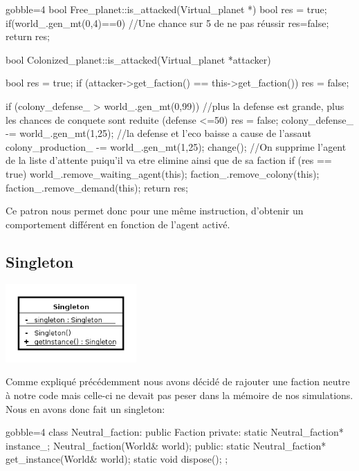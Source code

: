   \begin{cppcode*}{gobble=4}
    bool Free_planet::is_attacked(Virtual_planet *) {
      bool res = true;
        if(world_.gen_mt(0,4)==0){ //Une chance sur 5 de ne pas réussir
          res=false;
      }
      return res;
    }

    bool Colonized_planet::is_attacked(Virtual_planet *attacker) {
      bool res = true;
      if (attacker->get_faction() == this->get_faction()) {
          res = false;
      }
     
        if (colony_defense_ > world_.gen_mt(0,99)){ //plus la defense est grande, plus les chances de conquete sont reduite (defense <=50)
          res = false;
          colony_defense_ -= world_.gen_mt(1,25); //la defense et l'eco baisse a cause de l'assaut
          colony_production_ -= world_.gen_mt(1,25);
          change();
        }
      //On supprime l'agent de la liste d'attente puiqu'il va etre elimine ainsi que de sa faction
      if (res == true) {
          world_.remove_waiting_agent(this);
          faction_.remove_colony(this);
          faction_.remove_demand(this);
      }
      return res;
    }
  \end{cppcode*}
  Ce patron nous permet donc pour une même instruction, d’obtenir un comportement différent en fonction de l’agent activé.

  \subsection{Singleton}

  \begin{center}
    \includegraphics[height=3cm]{images/single.png}
  \end{center}

  Comme expliqué précédemment nous avons décidé de rajouter une faction neutre à notre code mais celle-ci ne devait pas peser dans la mémoire de nos simulations. Nous en avons donc fait un singleton:
  \begin{cppcode*}{gobble=4}
    class Neutral_faction: public Faction
    {
    private:
      static Neutral_faction* instance_;
      Neutral_faction(World& world);
    public:
      static Neutral_faction* get_instance(World& world);
      static void dispose();
    };
  \end{cppcode*}

